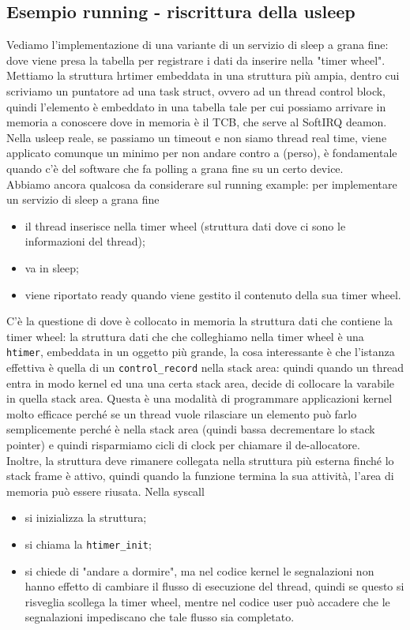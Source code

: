 \documentclass[12pt, oneside]{extbook}
\begin{document}
\subsection*{Esempio running - riscrittura della usleep}
Vediamo l'implementazione di una variante di un servizio di sleep a grana fine: dove viene presa la tabella per registrare i dati da inserire nella "timer wheel". Mettiamo la struttura hrtimer embeddata in una struttura più ampia, dentro cui scriviamo un puntatore ad una task struct, ovvero ad un thread control block, quindi l'elemento è embeddato in una tabella tale per cui possiamo arrivare in memoria a conoscere dove in memoria è il TCB, che serve al SoftIRQ deamon.\\Nella usleep reale, se passiamo un timeout e non siamo thread real time, viene applicato comunque un minimo per non andare contro a (perso), è fondamentale quando c'è del software che fa polling a grana fine su un certo device.\\Abbiamo ancora qualcosa da considerare sul running example: per implementare un servizio di sleep a grana fine
\begin{itemize}
\item il thread inserisce nella timer wheel (struttura dati dove ci sono le informazioni del thread);
\item va in sleep;
\item viene riportato ready quando viene gestito il contenuto della sua timer wheel.
\end{itemize}
C'è la questione di dove è collocato in memoria la struttura dati che contiene la timer wheel: la struttura dati che che colleghiamo nella timer wheel è una \texttt{htimer}, embeddata in un oggetto più grande, la cosa interessante è che l'istanza effettiva è quella di un \texttt{control\_record} nella stack area: quindi quando un thread entra in modo kernel ed una una certa stack area, decide di collocare la varabile in quella stack area. Questa è una modalità di programmare applicazioni kernel molto efficace perché se un thread vuole rilasciare un elemento può farlo semplicemente perché è nella stack area (quindi bassa decrementare lo stack pointer) e quindi risparmiamo cicli di clock per chiamare il de-allocatore.\\Inoltre, la struttura deve rimanere collegata nella struttura più esterna finché lo stack frame è attivo, quindi quando la funzione termina la sua attività, l'area di memoria può essere riusata. Nella syscall
\begin{itemize}
\item si inizializza la struttura;
\item si chiama la \texttt{htimer\_init};
\item si chiede di "andare a dormire", ma nel codice kernel le segnalazioni non hanno effetto di cambiare il flusso di esecuzione del thread, quindi se questo si risveglia scollega la timer wheel, mentre nel codice user può accadere che le segnalazioni impediscano che tale flusso sia completato.
\end{itemize}
\end{document}
